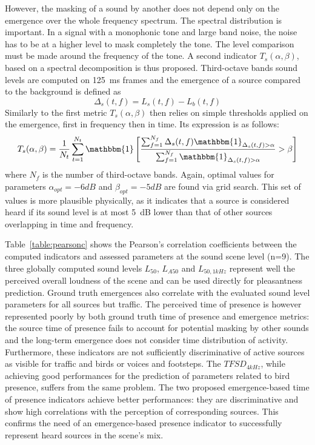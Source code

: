 \documentclass{article}
\begin{document}
\begin{sloppy}
However, the masking of a sound by another does not depend only on the emergence over the whole frequency spectrum. The spectral distribution is important. In a signal with a monophonic tone and large band noise, the noise has to be at a higher level to mask completely the tone. The level comparison must be made around the frequency of the tone. A second indicator $T_s(\alpha, \beta)$, based on a spectral decomposition is thus proposed. Third-octave bands sound levels are computed on 125~ms frames and the emergence of a source compared to the background is defined as
\begin{equation}
\Delta_s(t, f) = L_s(t, f) - L_b(t, f)
\end{equation}
Similarly to the first metric $T_s(\alpha, \beta)$ then relies on simple thresholds applied on the emergence, first in frequency then in time. Its expression is as follows:
\begin{equation}
T_s(\alpha, \beta) = \frac{1}{N_t}\sum_{t = 1}^{N_t}\mathbbm{1}\left[ \frac{\sum_{f = 1}^{N_f}\Delta_s(t, f)\mathbbm{1}_{\Delta_s(t, f)>\alpha}}{\sum_{f = 1}^{N_f}\mathbbm{1}_{\Delta_s(t, f)>\alpha}}>\beta \right]
\end{equation}
where $N_f$ is the number of third-octave bands. Again, optimal values for parameters $\alpha_{opt} = -6 dB$ and $\beta_{opt} = -5 dB$ are found via grid search. This set of values is more plausible physically, as it indicates that a source is considered heard if its sound level is at most 5~dB lower than that of other sources overlapping in time and frequency.

Table~\ref{table:pearsonc} shows the Pearson's correlation coefficients between the computed indicators and assessed parameters at the sound scene level (n=9). The three globally computed sound levels $L_{50}$, $L_{A50}$ and $L_{50,1kHz}$ represent well the perceived overall loudness of the scene and can be used directly for pleasantness prediction. Ground truth emergences also correlate with the evaluated sound level parameters for all sources but traffic. The perceived time of presence is however represented poorly by both ground truth time of presence and emergence metrics: the source time of presence fails to account for potential masking by other sounds and the long-term emergence does not consider time distribution of activity. Furthermore, these indicators are not sufficiently discriminative of active sources as visible for traffic and birds or voices and footsteps. The $TFSD_{4kHz}$, while achieving good performances for the prediction of parameters related to bird presence, suffers from the same problem. The two proposed emergence-based time of presence indicators achieve better performances: they are discriminative and show high correlations with the perception of corresponding sources. This confirms the need of an emergence-based presence indicator to successfully represent heard sources in the scene's mix.


\end{sloppy}
\end{document}
